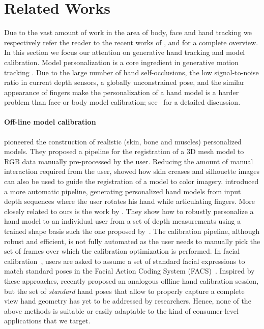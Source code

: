 \section{Related Works}
Due to the vast amount of work in the area of body, face and hand tracking we respectively refer the reader to the recent works of \cite{bogo2015detailed}, \cite{cao2016real} and \cite{taylor2016joint} for a complete overview. In this section we focus our attention on generative hand tracking and model calibration. Model personalization is a core ingredient in generative motion tracking \cite{pons2011model}.  Due to the large number of hand self-occlusions, the low signal-to-noise ratio in current depth sensors, a globally unconstrained pose, and the similar appearance of fingers make the personalization of a hand model is a harder problem than face or body model calibration; see~\cite{supancic2015depth} for a detailed discussion.

\paragraph{Off-line model calibration}
\cite{albrecht2003construction} pioneered the construction of realistic (skin, bone and muscles) personalized models. They proposed a pipeline for the registration of a 3D mesh model to RGB data manually pre-processed by the user. Reducing the amount of manual interaction required from the user, \cite{rhee2006human} showed how skin creases and silhouette images can also be used to guide the registration of a model to color imagery. \cite{taylor2014user} introduced a more automatic pipeline, generating personalized hand models from input depth sequences where the user rotates his hand while articulating fingers. More closely related to ours is the work by \cite{tan2016fits}. They show how to robustly personalize a hand model to an individual user from a set of depth measurements using a trained shape basis such the one proposed by~\cite{khamis2015learning}. The calibration pipeline, although robust and efficient, is not fully automated as the user needs to manually pick the set of frames over which the calibration optimization is performed. 
In facial calibration~\cite{weise2011realtime}, users are asked to assume a set of standard facial expressions to match standard poses in the Facial Action Coding System (FACS)~\cite{facs}.
Inspired by these approaches, \cite{taylor2016joint} recently proposed an analogous offline hand calibration session, but the set of \emph{standard} hand poses that allow to properly capture a complete view hand geometry has yet to be addressed by researchers. Hence, none of the above methods is suitable or easily adaptable to the kind of consumer-level applications that we target.

